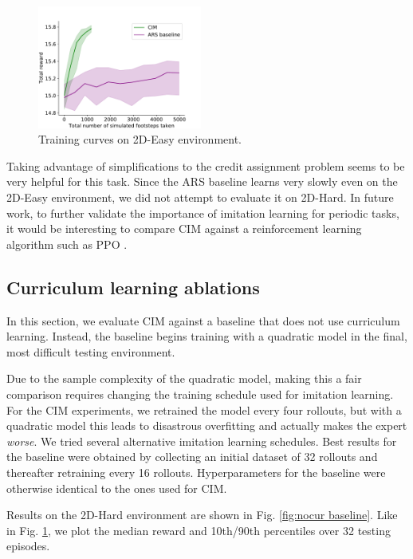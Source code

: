\documentclass[conference]{IEEEtran}
\begin{document}
\begin{figure}
  \includegraphics[width=0.48\textwidth]{../figures/ars_baseline.pdf}
  \caption{\label{fig:ars baseline} Training curves on 2D-Easy environment.}
\end{figure}

Taking advantage of simplifications to the credit assignment problem seems to be very helpful for this task.
Since the ARS baseline learns very slowly even on the 2D-Easy environment, we did not attempt to evaluate it on 2D-Hard.
In future work, to further validate the importance of imitation learning for periodic tasks, it would be interesting to compare CIM against a reinforcement learning algorithm such as PPO \citep{schulman2017proximal}.

\subsection{Curriculum learning ablations}

In this section, we evaluate CIM against a baseline that does not use curriculum learning.
Instead, the baseline begins training with a quadratic model in the final, most difficult testing environment.

Due to the sample complexity of the quadratic model, making this a fair comparison requires changing the training schedule used for imitation learning.
For the CIM experiments, we retrained the model every four rollouts,
but with a quadratic model this leads to disastrous overfitting and actually makes the expert \emph{worse}.
We tried several alternative imitation learning schedules.
Best results for the baseline were obtained by collecting an initial dataset of 32 rollouts and thereafter retraining every 16 rollouts.
Hyperparameters for the baseline were otherwise identical to the ones used for CIM.

Results on the 2D-Hard environment are shown in Fig. \ref{fig:nocur baseline}.
Like in Fig. \ref{fig:ars baseline},
we plot the median reward and 10th/90th percentiles over 32 testing episodes.
\end{document}

